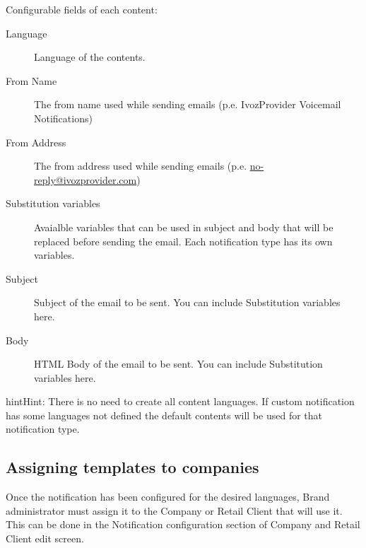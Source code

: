 \documentclass[letterpaper,10pt,english]{sphinxmanual}
\begin{document}
Configurable fields of each content:
\begin{description}
\item[{Language}] \leavevmode{}\label{brand/notifications:term-language}
Language of the contents.

\item[{From Name}] \leavevmode{}\label{brand/notifications:term-from-name}
The from name used while sending emails (p.e. IvozProvider Voicemail Notifications)

\item[{From Address}] \leavevmode{}\label{brand/notifications:term-from-address}
The from address used while sending emails (p.e. \href{mailto:no-reply@ivozprovider.com}{no-reply@ivozprovider.com})

\item[{Substitution variables}] \leavevmode{}\label{brand/notifications:term-substitution-variables}
Avaialble variables that can be used in subject and body that will be replaced before sending the email. Each
notification type has its own variables.

\item[{Subject}] \leavevmode{}\label{brand/notifications:term-subject}
Subject of the email to be sent. You can include Substitution variables here.

\item[{Body}] \leavevmode{}\label{brand/notifications:term-body}
HTML Body of the email to be sent. You can include Substitution variables here.

\end{description}

\begin{notice}{hint}{Hint:}
There is no need to create all content languages. If custom notification has some languages not defined the
default contents will be used for that notification type.
\end{notice}


\subsection{Assigning templates to companies}
\label{brand/notifications:assigning-templates-to-companies}
Once the notification has been configured for the desired languages, Brand administrator must assign it to the
Company or Retail Client that will use it. This can be done in the Notification configuration section of Company and
Retail Client edit screen.
\end{document}
